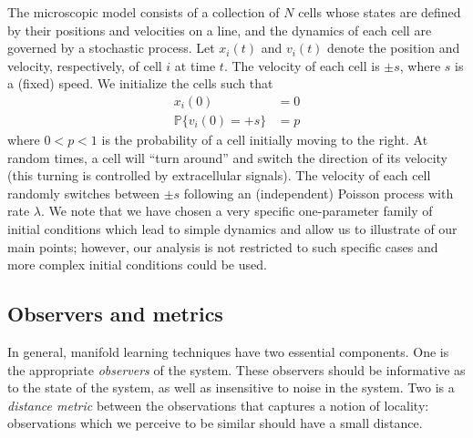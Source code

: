 \documentclass[preprint]{elsarticle}
\begin{document}
The microscopic model consists of a collection of $N$ cells whose states are defined by their positions and velocities on a line, and the dynamics of each cell are governed by a stochastic process.
%
Let $x_i(t)$ and $v_i(t)$ denote the position and velocity, respectively, of cell $i$ at time $t$.
%
The velocity of each cell is $\pm s$, where $s$ is a (fixed) speed. 
%
We initialize the cells such that
\begin{equation}\label{eqn:system}
\begin{aligned}
x_i(0) & = 0 \\
\mathbb{P} \{ v_i(0) = +s \} & = p
\end{aligned}
\end{equation}
where $0 < p < 1$ is the probability of a cell initially moving to the right.
%
At random times, a cell will ``turn around'' and switch the direction of its velocity (this turning is controlled by extracellular signals). 
%
The velocity of each cell randomly switches between $\pm s$ following an (independent) Poisson process with rate $\lambda$.
%
We note that we have chosen a very specific one-parameter family of initial conditions which lead to simple dynamics and allow us to illustrate of our main points;
however, our analysis is not restricted to such specific cases and more complex initial conditions could be used. 


\subsection{Observers and metrics}

In general, manifold learning techniques have two essential components.
%
One is the appropriate {\em observers} of the system. 
%
These observers should be informative as to the state of the system, as well as insensitive to noise in the system. 
%
Two is a {\em distance metric} between the observations that captures a notion of locality: observations which we perceive to be similar should have a small distance. 
%
\end{document}
